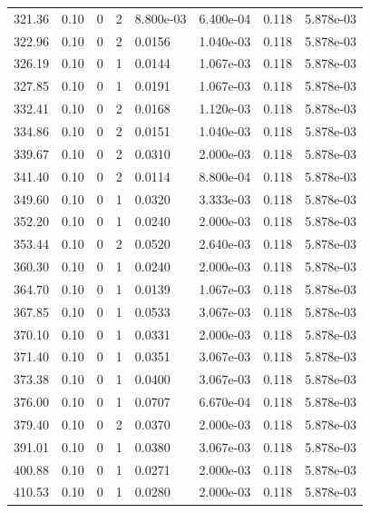 \documentclass[preview]{standalone}
\begin{document}
{{{{{\begin{tabular}{L{1.2cm}C{1.2cm} C{0.3cm}C{0.5cm} C{1.4cm}C{1.4cm} C{1.4cm}C{1.4cm}}
  321.36  &  0.10  & 0     &  2 &  8.800e-03  & 6.400e-04  & 0.118 &  5.878e-03   \\ 
  322.96  &  0.10  & 0     &  2 &  0.0156  & 1.040e-03  & 0.118 &  5.878e-03   \\ 
  326.19  &  0.10  & 0     &  1 &  0.0144  & 1.067e-03  & 0.118 &  5.878e-03   \\ 
  327.85  &  0.10  & 0     &  1 &  0.0191  & 1.067e-03  & 0.118 &  5.878e-03   \\ 
  332.41  &  0.10  & 0     &  2 &  0.0168  & 1.120e-03  & 0.118 &  5.878e-03   \\ 
  334.86  &  0.10  & 0     &  2 &  0.0151  & 1.040e-03  & 0.118 &  5.878e-03   \\ 
  339.67  &  0.10  & 0     &  2 &  0.0310  & 2.000e-03  & 0.118 &  5.878e-03   \\ 
  341.40  &  0.10  & 0     &  2 &  0.0114  & 8.800e-04  & 0.118 &  5.878e-03   \\ 
  349.60  &  0.10  & 0     &  1 &  0.0320  & 3.333e-03  & 0.118 &  5.878e-03   \\ 
  352.20  &  0.10  & 0     &  1 &  0.0240  & 2.000e-03  & 0.118 &  5.878e-03   \\ 
  353.44  &  0.10  & 0     &  2 &  0.0520  & 2.640e-03  & 0.118 &  5.878e-03   \\ 
  360.30  &  0.10  & 0     &  1 &  0.0240  & 2.000e-03  & 0.118 &  5.878e-03   \\ 
  364.70  &  0.10  & 0     &  1 &  0.0139  & 1.067e-03  & 0.118 &  5.878e-03   \\ 
  367.85  &  0.10  & 0     &  1 &  0.0533  & 3.067e-03  & 0.118 &  5.878e-03   \\ 
  370.10  &  0.10  & 0     &  1 &  0.0331  & 2.000e-03  & 0.118 &  5.878e-03   \\ 
  371.40  &  0.10  & 0     &  1 &  0.0351  & 3.067e-03  & 0.118 &  5.878e-03   \\ 
  373.38  &  0.10  & 0     &  1 &  0.0400  & 3.067e-03  & 0.118 &  5.878e-03   \\ 
  376.00  &  0.10  & 0     &  1 &  0.0707  & 6.670e-04  & 0.118 &  5.878e-03   \\ 
  379.40  &  0.10  & 0     &  2 &  0.0370  & 2.000e-03  & 0.118 &  5.878e-03   \\ 
  391.01  &  0.10  & 0     &  1 &  0.0380  & 3.067e-03  & 0.118 &  5.878e-03   \\ 
  400.88  &  0.10  & 0     &  1 &  0.0271  & 2.000e-03  & 0.118 &  5.878e-03   \\ 
  410.53  &  0.10  & 0     &  1 &  0.0280  & 2.000e-03  & 0.118 &  5.878e-03   \\ 

\end{tabular}}}}}}
\end{document}
